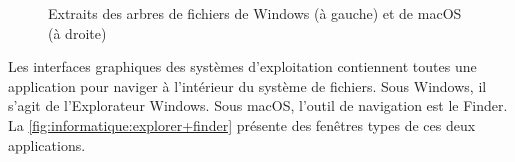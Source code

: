\begin{figure}
  \begin{minipage}[t]{0.45\linewidth}
  \end{minipage}
  \hfill
  \begin{minipage}[t]{0.45\linewidth}
  \end{minipage}
  \caption[Extraits de la hiérarchie des systèmes de fichiers]{%
    Extraits des arbres de fichiers de Windows (à gauche) et de
    macOS (à droite)}
  \label{fig:informatique:fs}
\end{figure}

Les interfaces graphiques des systèmes d'exploitation contiennent
toutes une application pour naviger à l'intérieur du système de
fichiers. Sous Windows, il s'agit de l'Explorateur Windows. Sous macOS, l'outil de navigation est
le Finder. La \autoref{fig:informatique:explorer+finder}
présente des fenêtres types de ces deux applications.

